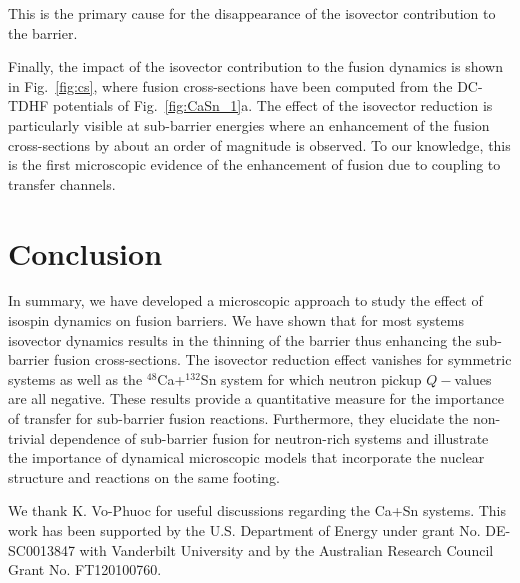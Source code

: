 This is the primary cause for the disappearance of the isovector contribution to the barrier.

Finally, the impact of the isovector contribution to the fusion dynamics is shown in Fig.~\ref{fig:cs},
where fusion cross-sections have been computed from the DC-TDHF potentials of Fig.~\ref{fig:CaSn_1}a.
The effect of the isovector reduction is particularly visible at sub-barrier energies where an enhancement
of the fusion cross-sections by about an order of magnitude is observed.
To our knowledge, this is the first microscopic evidence of the enhancement
of fusion due to coupling to transfer channels.

\section{Conclusion}

In summary, we have developed a microscopic approach to study the effect of isospin dynamics on fusion barriers.
We have shown that for most systems isovector dynamics results in the thinning of the barrier thus enhancing
the sub-barrier fusion cross-sections. The isovector reduction effect vanishes for symmetric systems as well
as the $^{48}$Ca+$^{132}$Sn system for which neutron pickup $Q-$values are all negative.
These results provide a quantitative measure for the importance of transfer for
sub-barrier fusion reactions.
Furthermore, they elucidate the non-trivial dependence of sub-barrier fusion for neutron-rich
systems and illustrate the importance of dynamical microscopic models that incorporate the nuclear
structure and reactions on the same footing.

We thank K. Vo-Phuoc for useful discussions regarding the Ca+Sn systems.
This work has been supported by the U.S. Department of Energy under grant No.
DE-SC0013847 with Vanderbilt University and by the
Australian Research Council Grant No. FT120100760.

\clearpage

